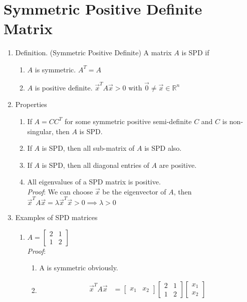 \documentclass[11pt]{article}
\begin{document}
\newpage
\section{Symmetric Positive Definite Matrix}
\begin{enumerate}
\item Definition. (Symmetric Positive Definite) A matrix $A$ is SPD if 
\begin{enumerate}
\item $A$ is symmetric. $A^{T} = A$
\item $A$ is positive definite. $\vec{x}^{T} A \vec{x} > 0$ with $\vec{0} \neq \vec{x} \in \mathbb{R}^{n} $
\end{enumerate}
\item Properties 
\begin{enumerate}
\item If $A = CC^{T}$ for some symmetric positive semi-definite $C$ and $C$ is non-singular, then $A$ is SPD.
\item If $A$ is SPD, then all sub-matrix of $A$ is SPD also.
\item If $A$ is SPD, then all diagonal entries of $A$ are positive.
\item All eigenvalues of a SPD matrix is positive.\\
\textit{Proof}:
We can choose $\vec{x}$ be the eigenvector of $A$, then $\vec{x}^T A \vec{x} = \lambda \vec{x}^T \vec{x} > 0 \implies \lambda > 0$
\end{enumerate}
\item Examples of SPD matrices
\begin{enumerate}
\item $A = \begin{bmatrix}
2& 1\\
1& 2
\end{bmatrix}$\\
\textit{Proof}: 
\begin{enumerate}
\item A is symmetric obviously.
\item \begin{align*}
\vec{x}^{T} A \vec{x} &= \begin{bmatrix}
x_1 & x_2
\end{bmatrix}  \begin{bmatrix}
2& 1\\
1& 2
\end{bmatrix} \begin{bmatrix}
x_1 \\
 x_2
\end{bmatrix}\\

\end{align*}
\end{enumerate}
\end{enumerate}
\end{enumerate}
\end{document}

